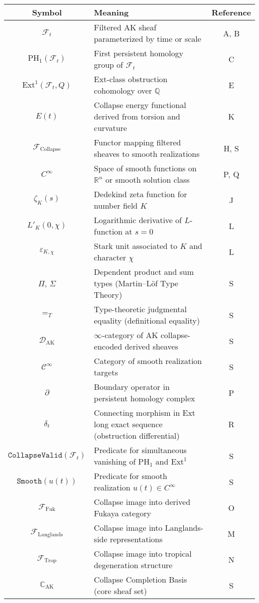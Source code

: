 \documentclass[11pt]{article}
\begin{document}
\begin{center}
\begin{tabular}{|c|p{8cm}|c|}
\hline
\textbf{Symbol} & \textbf{Meaning} & \textbf{Reference} \\
\hline
$\mathcal{F}_t$ & Filtered AK sheaf parameterized by time or scale & A, B \\
$\mathrm{PH}_1(\mathcal{F}_t)$ & First persistent homology group of $\mathcal{F}_t$ & C \\
$\mathrm{Ext}^1(\mathcal{F}_t, Q)$ & Ext-class obstruction cohomology over $\mathbb{Q}$ & E \\
$E(t)$ & Collapse energy functional derived from torsion and curvature & K \\
$\mathcal{F}_{\mathrm{Collapse}}$ & Functor mapping filtered sheaves to smooth realizations & H, S \\
$C^\infty$ & Space of smooth functions on $\mathbb{R}^n$ or smooth solution class & P, Q \\
$\zeta_K(s)$ & Dedekind zeta function for number field $K$ & J \\
$L'_K(0,\chi)$ & Logarithmic derivative of $L$-function at $s=0$ & L \\
$\varepsilon_{K,\chi}$ & Stark unit associated to $K$ and character $\chi$ & L \\
$\Pi$, $\Sigma$ & Dependent product and sum types (Martin–Löf Type Theory) & S \\
$=_T$ & Type-theoretic judgmental equality (definitional equality) & S \\
$\mathcal{D}_{\mathrm{AK}}$ & $\infty$-category of AK collapse-encoded derived sheaves & S \\
$\mathcal{C}^\infty$ & Category of smooth realization targets & S \\
$\partial$ & Boundary operator in persistent homology complex & P \\
$\delta_t$ & Connecting morphism in Ext long exact sequence (obstruction differential) & R \\
$\texttt{CollapseValid}(\mathcal{F}_t)$ & Predicate for simultaneous vanishing of $\mathrm{PH}_1$ and $\mathrm{Ext}^1$ & S \\
$\texttt{Smooth}(u(t))$ & Predicate for smooth realization $u(t) \in C^\infty$ & S \\
$\mathcal{F}_{\mathrm{Fuk}}$ & Collapse image into derived Fukaya category & O \\
$\mathcal{F}_{\mathrm{Langlands}}$ & Collapse image into Langlands-side representations & M \\
$\mathcal{F}_{\mathrm{Trop}}$ & Collapse image into tropical degeneration structure & N \\
$\mathbb{C}_{\mathrm{AK}}$ & Collapse Completion Basis (core sheaf set) & S \\
\hline
\end{tabular}
\end{center}
\end{document}
